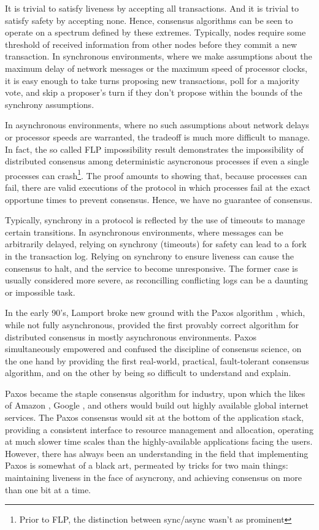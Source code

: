 It is trivial to satisfy liveness by accepting all transactions. And it is trivial to satisfy safety by accepting none.
Hence, consensus algorithms can be seen to operate on a spectrum defined by these extremes.
Typically, nodes require some threshold of received information from other nodes before they commit a new transaction.
In synchronous environments, 
where we make assumptions about the maximum delay of network messages or the maximum speed of processor clocks,
 it is easy enough to take turns proposing new transactions, poll for a majority vote, 
and skip a proposer's turn if they don't propose within the bounds of the synchrony assumptions.

In asynchronous environments, where no such assumptions about network delays or processor speeds are warranted,
the tradeoff is much more difficult to manage.
In fact, the so called FLP impossibility result demonstrates the 
impossibility of distributed consensus among deterministic asyncronous processes 
if even a single processes can crash\footnote{Prior to FLP, the distinction between sync/async wasn't as prominent}\cite{flp}.
The proof amounts to showing that, because processes can fail, 
there are valid executions of the protocol in which processes fail at the exact opportune times to prevent consensus.
Hence, we have no guarantee of consensus.

Typically, synchrony in a protocol is reflected by the use of timeouts to manage certain transitions.
In asynchronous environments, where messages can be arbitrarily delayed, relying on synchrony (timeouts) for safety
can lead to a fork in the transaction log.
Relying on synchrony to ensure liveness can cause the consensus to halt, and the service to become unresponsive.
The former case is usually considered more severe, as reconcilling conflicting logs can be a daunting or impossible task. 

In the early 90's, Lamport broke new ground with the Paxos algorithm \cite{paxos},
which, while not fully asynchronous,
provided the first provably correct algorithm for distributed consensus in mostly asynchronous environments.
Paxos simultaneously empowered and confused the discipline of consensus science,
on the one hand by providing the first real-world, practical, fault-tolerant consensus algorithm,
and on the other by being so difficult to understand and explain.

Paxos became the staple consensus algorithm for industry, 
upon which the likes of Amazon \cite{dynamo}, Google \cite{chubby}, 
and others would build out highly available global internet services.
The Paxos consensus would sit at the bottom of the application stack, 
providing a consistent interface to resource management and allocation, 
operating at much slower time scales than the highly-available applications facing the users.
However, there has always been an understanding in the field that implementing Paxos is somewhat of a black art,
permeated by tricks for two main things: 
maintaining liveness in the face of asyncrony, and achieving consensus on more than one bit at a time.

